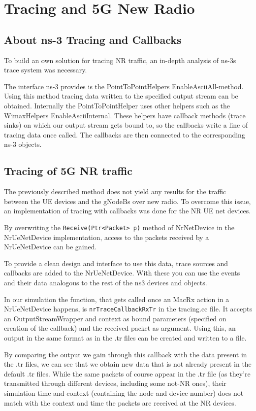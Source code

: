 \section{Tracing and 5G New Radio}
\subsection{About ns-3 Tracing and Callbacks}
To build an own solution for tracing NR traffic, an in-depth analysis of ns-3s trace system was necessary.

The interface ns-3 provides is the PointToPointHelpers EnableAsciiAll-method. Using this method tracing data written to the specified output stream can be obtained. Internally the PointToPointHelper uses other helpers such as the WimaxHelpers EnableAsciiInternal. These helpers have callback methods (trace sinks) on which our output stream gets bound to, so the callbacks write a line of tracing data once called. The callbacks are then connected to the corresponding ns-3 objects. 

\subsection{Tracing of 5G NR traffic}
\label{subsection:tracing-5g-nr}
The previously described method does not yield any results for the traffic between the UE devices and the gNodeBs over new radio. To overcome this issue, an implementation of tracing with callbacks was done for the NR UE net devices. 

By overwriting the \texttt{Receive(Ptr<Packet> p)} method of NrNetDevice in the NrUeNetDevice implementation, access to the packets received by a NrUeNetDevice can be gained.

To provide a clean design and interface to use this data, trace sources and callbacks are added to the NrUeNetDevice. With these you can use the events and their data analogous to the rest of the ns3 devices and objects.

In our simulation the function, that gets called once an MacRx action in a NrUeNetDevice happens, is \texttt{nrTraceCallbackRxTr} in the tracing.cc file. It accepts an OutputStreamWrapper and context as bound parameters (specified on creation of the callback) and the received packet as argument. Using this, an output in the same format as in the .tr files can be created and written to a file.

By comparing the output we gain through this callback with the data present in the .tr files, we can see that we obtain new data that is not already present in the default .tr files. While the same packets of course appear in the .tr file (as they're transmitted through different devices, including some not-NR ones), their simulation time and context (containing the node and device number) does not match with the context and time the packets are received at the NR devices. 

